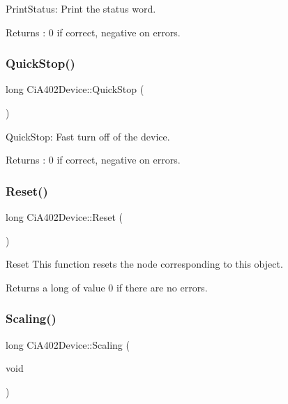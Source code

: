 Print\+Status\+: Print the status word. 

\begin{DoxyReturn}{Returns}
\+: 0 if correct, negative on errors. 
\end{DoxyReturn}
\mbox{\label{classCiA402Device_a8573afbf420c29aa86cd215d74f4e4e3}} 
\subsubsection{\texorpdfstring{Quick\+Stop()}{QuickStop()}}
{\footnotesize\ttfamily long Ci\+A402\+Device\+::\+Quick\+Stop (\begin{DoxyParamCaption}{ }\end{DoxyParamCaption})}



Quick\+Stop\+: Fast turn off of the device. 

\begin{DoxyReturn}{Returns}
\+: 0 if correct, negative on errors. 
\end{DoxyReturn}
\mbox{\label{classCiA402Device_ac4a6e4987ebe075d0ac07ee5fd4d410c}} 
\subsubsection{\texorpdfstring{Reset()}{Reset()}}
{\footnotesize\ttfamily long Ci\+A402\+Device\+::\+Reset (\begin{DoxyParamCaption}{ }\end{DoxyParamCaption})}



Reset This function resets the node corresponding to this object. 

\begin{DoxyReturn}{Returns}
a long of value 0 if there are no errors. 
\end{DoxyReturn}
\mbox{\label{classCiA402Device_ae9b30263a0592f0b254ae4f32cd9a765}} 
\subsubsection{\texorpdfstring{Scaling()}{Scaling()}}
{\footnotesize\ttfamily long Ci\+A402\+Device\+::\+Scaling (\begin{DoxyParamCaption}\item[{void}]{ }\end{DoxyParamCaption})}

